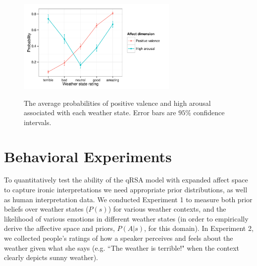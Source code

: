 \documentclass[10pt,letterpaper]{article}
\begin{document}

\begin{figure}
\includegraphics[width=220pt, height=150pt]{affect-prior.pdf}
\caption{The average probabilities of positive valence and high arousal associated with each weather state. Error bars are $95\%$ confidence intervals.}
\label{affect-prior}
\end{figure}

\section{Behavioral Experiments}
To quantitatively test the ability of the qRSA model with expanded affect space to capture ironic interpretations we need appropriate prior distributions, as well as human interpretation data.
We conducted Experiment 1 to measure both prior beliefs over weather states ($P(s)$) for various weather contexts, and the likelihood of various emotions in different weather states (in order to empirically derive the affective space and priors, $P(A | s)$, for this domain).
In Experiment 2, we collected people's ratings of how a speaker perceives and feels about the weather given what she says (e.g. ``The weather is terrible!" when the context clearly depicts sunny weather).
\end{document}
